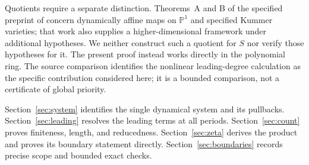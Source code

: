 Quotients require a separate distinction. Theorems~A and B of the
specified preprint of \cite{bch2020affine} concern dynamically affine maps
on $\mathbb P^1$ and specified Kummer varieties; that work also supplies
a higher-dimensional framework under additional hypotheses.
We neither construct such a quotient for $S$ nor verify those hypotheses
for it. The present proof instead works directly in the polynomial ring.
The source comparison identifies the nonlinear leading-degree calculation
as the specific contribution considered here; it is a bounded comparison,
not a certificate of global priority.

Section~\ref{sec:system} identifies the single dynamical system and its
pullbacks. Section~\ref{sec:leading} resolves the leading terms at all
periods. Section~\ref{sec:count} proves finiteness, length, and reducedness.
Section~\ref{sec:zeta} derives the product and proves its boundary
statement directly. Section~\ref{sec:boundaries} records precise scope
and bounded exact checks.
